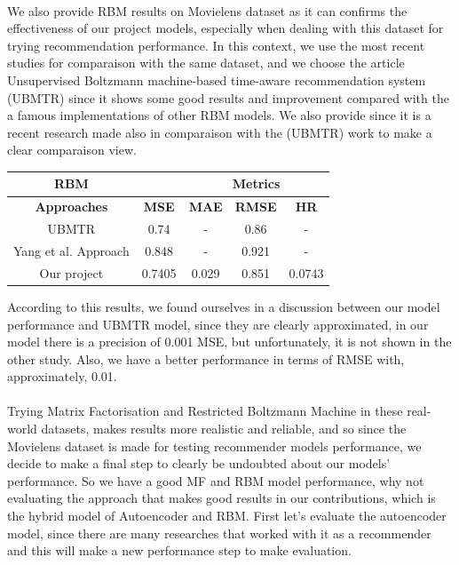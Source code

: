 \documentclass{cup-pan}
\begin{document}
\paragraph{}
We also provide RBM results on Movielens dataset as it can confirms the effectiveness of our project models, especially when dealing with this dataset for trying recommendation performance. In this context, we use the most recent studies for comparaison with the same dataset, and we choose the article Unsupervised Boltzmann machine-based time-aware recommendation system (UBMTR) \cite{22} since it shows some good results and improvement compared with the a famous implementations of other RBM models. We also provide \cite{23} since it is a recent research made also in comparaison with the (UBMTR) work to make a clear comparaison view.
\begin{center} 
  \begin{tabular}{||c||c|c|c|c||}
    \hline\hline 
    \textbf{RBM} & \multicolumn{1}{c}{\textbf{}} & \multicolumn{3}{c||}{\hspace{-1.5cm}\textbf{Metrics}} \\
    \hline\hline 
    \multicolumn{1}{||c||}{\textbf{Approaches}} & \textbf{MSE} & \textbf{MAE} & \textbf{RMSE} & \textbf{HR} \\
    \hline 
    UBMTR & 0.74 & - & 0.86 & - \\
    Yang et al. Approach & 0.848 & - & 0.921 & - \\
    Our project & 0.7405 & 0.029 & 0.851 & 0.0743 \\
    \hline\hline
  \end{tabular}
\end{center}

According to this results, we found ourselves in a discussion between our model performance and UBMTR model, since they are clearly approximated, in our model there is a precision of 0.001 MSE, but unfortunately, it is not shown in the other study. Also, we have a better performance in terms of RMSE with, approximately, 0.01.


\paragraph{}
Trying Matrix Factorisation and Restricted Boltzmann Machine in these real-world datasets, makes results more realistic and reliable, and so since the Movielens dataset is made for testing recommender models performance, we decide to make a final step to clearly be undoubted about our models' performance. So we have a good MF and RBM model performance, why not evaluating the approach that makes good results in our contributions, which is the hybrid model of Autoencoder and RBM. First let's evaluate the autoencoder model, since there are many researches that worked with it as a recommender and this will make a new performance step to make evaluation.
\end{document}
